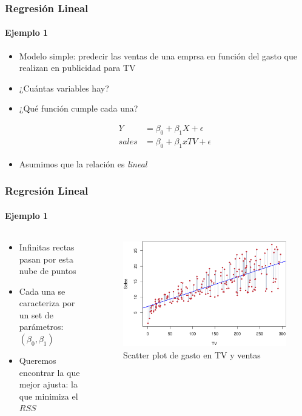 \documentclass{beamer}
\begin{document}
\begin{frame}
\frametitle{Regresión Lineal}
\framesubtitle{Ejemplo 1}
\begin{itemize}
	\item Modelo simple: predecir las ventas de una emprsa en función del gasto que realizan en publicidad para TV
	\item ¿Cuántas variables hay?
	\item ¿Qué función cumple cada una?

	\begin{equation}
	\begin{aligned}
    	Y & =      \beta_{0} + \beta_{1}X + \epsilon \\
		sales & =  \beta_{0} + \beta_{1} x TV + \epsilon
	\end{aligned}
	\end{equation}
	\item Asumimos que la relación es \textit{lineal}
\end{itemize}
\end{frame}


\begin{frame}
\frametitle{Regresión Lineal}
\framesubtitle{Ejemplo 1}
\begin{columns}
	\begin{column}{0.35\textwidth}
	\begin{itemize}
		\item Infinitas rectas pasan por esta nube de puntos
		\item Cada una se caracteriza por un set de parámetros: $(\beta_{0}, \beta_{1})$
		\item Queremos encontrar la que mejor ajusta: la que minimiza el $RSS$
	\end{itemize}
	\end{column}
	\begin{column}{0.58\textwidth}
		\centering
		\begin{figure}[h]	
			\includegraphics[width=0.95\linewidth, height=0.6\textheight]{./img/pdf/3_1}
			\caption{Scatter plot de gasto en TV y ventas \cite{hastie02}}
		\end{figure}
	\end{column}
\end{columns}
\end{frame}
\end{document}
